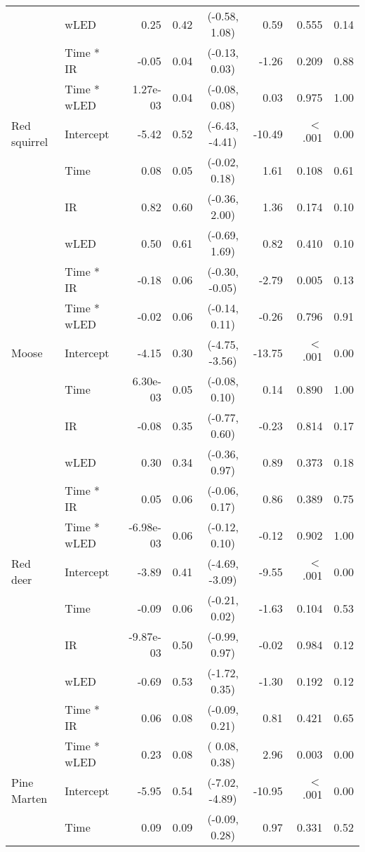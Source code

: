 \begin{tabular}[c]{llrlcrrr}
   & wLED & 0.25 & 0.42 & (-0.58,  1.08) & 0.59 & 0.555  & 0.14 \\ 
   & Time * IR & -0.05 & 0.04 & (-0.13,  0.03) & -1.26 & 0.209  & 0.88 \\ 
   & Time * wLED & 1.27e-03 & 0.04 & (-0.08,  0.08) & 0.03 & 0.975  & 1.00 \\ 
  Red squirrel & Intercept & -5.42 & 0.52 & (-6.43, -4.41) & -10.49 & $<$ .001 & 0.00 \\ 
   & Time & 0.08 & 0.05 & (-0.02,  0.18) & 1.61 & 0.108  & 0.61 \\ 
   & IR & 0.82 & 0.60 & (-0.36,  2.00) & 1.36 & 0.174  & 0.10 \\ 
   & wLED & 0.50 & 0.61 & (-0.69,  1.69) & 0.82 & 0.410  & 0.10 \\ 
   & Time * IR & -0.18 & 0.06 & (-0.30, -0.05) & -2.79 & 0.005  & 0.13 \\ 
   & Time * wLED & -0.02 & 0.06 & (-0.14,  0.11) & -0.26 & 0.796  & 0.91 \\ 
  Moose & Intercept & -4.15 & 0.30 & (-4.75, -3.56) & -13.75 & $<$ .001 & 0.00 \\ 
   & Time & 6.30e-03 & 0.05 & (-0.08,  0.10) & 0.14 & 0.890  & 1.00 \\ 
   & IR & -0.08 & 0.35 & (-0.77,  0.60) & -0.23 & 0.814  & 0.17 \\ 
   & wLED & 0.30 & 0.34 & (-0.36,  0.97) & 0.89 & 0.373  & 0.18 \\ 
   & Time * IR & 0.05 & 0.06 & (-0.06,  0.17) & 0.86 & 0.389  & 0.75 \\ 
   & Time * wLED & -6.98e-03 & 0.06 & (-0.12,  0.10) & -0.12 & 0.902  & 1.00 \\ 
  Red deer & Intercept & -3.89 & 0.41 & (-4.69, -3.09) & -9.55 & $<$ .001 & 0.00 \\ 
   & Time & -0.09 & 0.06 & (-0.21,  0.02) & -1.63 & 0.104  & 0.53 \\ 
   & IR & -9.87e-03 & 0.50 & (-0.99,  0.97) & -0.02 & 0.984  & 0.12 \\ 
   & wLED & -0.69 & 0.53 & (-1.72,  0.35) & -1.30 & 0.192  & 0.12 \\ 
   & Time * IR & 0.06 & 0.08 & (-0.09,  0.21) & 0.81 & 0.421  & 0.65 \\ 
   & Time * wLED & 0.23 & 0.08 & ( 0.08,  0.38) & 2.96 & 0.003  & 0.00 \\ 
  Pine Marten & Intercept & -5.95 & 0.54 & (-7.02, -4.89) & -10.95 & $<$ .001 & 0.00 \\ 
   & Time & 0.09 & 0.09 & (-0.09,  0.28) & 0.97 & 0.331  & 0.52 \\ 

\end{tabular}
